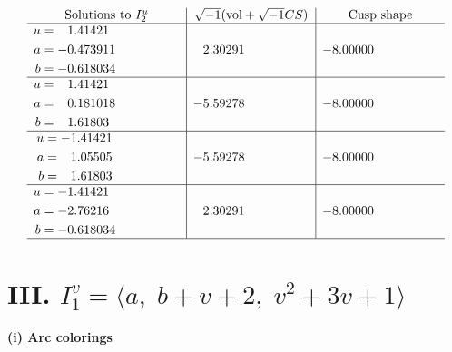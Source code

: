 \documentclass[1p]{elsarticle_modified}
\theoremstyle{definition}
\newcommand{\I}{\sqrt{-1}}
\begin{document}
$$\begin{array}{c|c|c}  
\text{Solutions to }I^u_{2}& \I (\text{vol} + \sqrt{-1}CS) & \text{Cusp shape}\\
 \hline 
\begin{aligned}
u &= \phantom{-}1.41421\phantom{ +0.000000I} \\
a &= -0.473911\phantom{ +0.000000I} \\
b &= -0.618034\phantom{ +0.000000I}\end{aligned}
 & \phantom{-}2.30291\phantom{ +0.000000I} & -8.00000\phantom{ +0.000000I} \\ \hline\begin{aligned}
u &= \phantom{-}1.41421\phantom{ +0.000000I} \\
a &= \phantom{-}0.181018\phantom{ +0.000000I} \\
b &= \phantom{-}1.61803\phantom{ +0.000000I}\end{aligned}
 & -5.59278\phantom{ +0.000000I} & -8.00000\phantom{ +0.000000I} \\ \hline\begin{aligned}
u &= -1.41421\phantom{ +0.000000I} \\
a &= \phantom{-}1.05505\phantom{ +0.000000I} \\
b &= \phantom{-}1.61803\phantom{ +0.000000I}\end{aligned}
 & -5.59278\phantom{ +0.000000I} & -8.00000\phantom{ +0.000000I} \\ \hline\begin{aligned}
u &= -1.41421\phantom{ +0.000000I} \\
a &= -2.76216\phantom{ +0.000000I} \\
b &= -0.618034\phantom{ +0.000000I}\end{aligned}
 & \phantom{-}2.30291\phantom{ +0.000000I} & -8.00000\phantom{ +0.000000I}\\
 \hline 
 \end{array}$$\newpage\newpage\renewcommand{\arraystretch}{1}
\centering \section*{III. $I^v_{1}= \langle a,\;b+v+2,\;v^2+3 v+1 \rangle$}
\flushleft \textbf{(i) Arc colorings}\\
\end{document}
